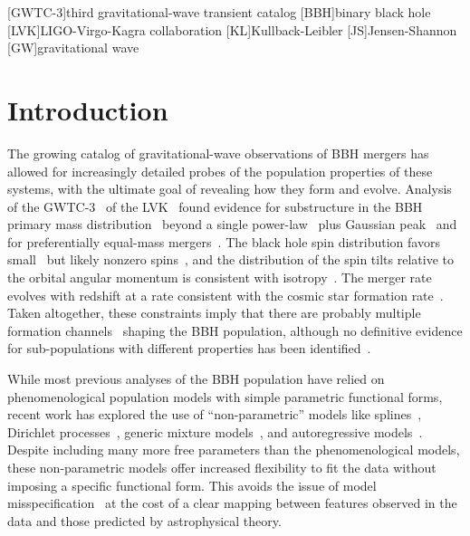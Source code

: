 \documentclass[%
 reprint,
 amsmath,amssymb,
 aps,
 prd,
]{revtex4-2}
\begin{document}
[GWTC-3]{third gravitational-wave transient catalog}
[BBH]{binary black hole}
[LVK]{LIGO-Virgo-Kagra collaboration}
[KL]{Kullback-Leibler}
[JS]{Jensen-Shannon}
[GW]{gravitational wave}


\section{Introduction}
The growing catalog of gravitational-wave observations of \acf{BBH} mergers has allowed for increasingly detailed probes of the population properties of these systems, with the ultimate goal of revealing how they form and evolve. Analysis of the \acf{GWTC-3}~\cite{LIGOScientific:2021djp} of the \acf{LVK}~\cite{TheLIGOScientific:2014jea, TheVirgo:2014hva, Aso:2013eba, Somiya:2011np, KAGRA:2020tym} found evidence for substructure in the \ac{BBH} primary mass distribution~\cite{KAGRA:2021duu, Tiwari:2020otp, Edelman:2021zkw} beyond a single power-law~\cite{Fishbach:2017zga} plus Gaussian peak~\cite{Talbot:2018cva} and for preferentially equal-mass mergers~\cite{Fishbach:2019bbm, Farah:2023swu}. The black hole spin distribution favors small~\cite{Wysocki:2018} but likely nonzero spins~\cite{Biscoveanu:2020are, Callister:2022qwb, Tong:2022iws, Mould:2022xeu, Galaudage:2021rkt, Roulet:2021hcu}, and the distribution of the spin tilts relative to the orbital angular momentum is consistent with isotropy~\cite{Roulet:2021hcu, KAGRA:2021duu, Vitale:2022dpa}. The merger rate evolves with redshift at a rate consistent with the cosmic star formation rate~\cite{Fishbach:2021yvy}. Taken altogether, these constraints imply that there are probably multiple formation channels~\cite{Zevin:2020gbd, Cheng:2023ddt, Wong:2020ise} shaping the \ac{BBH} population, although no definitive evidence for sub-populations with different properties has been identified~\cite{Baibhav:2022qxm, Godfrey:2023oxb, Wang:2022gnx}.

While most previous analyses of the \ac{BBH} population have relied on phenomenological population models with simple parametric functional forms, recent work has explored the use of ``non-parametric'' models like splines~\cite{Edelman:2022ydv, Golomb:2022bon}, Dirichlet processes~\cite{Rinaldi:2021bhm}, generic mixture models~\cite{Tiwari:2020otp,Tiwari:2020vym,Tiwari:2021yvr}, and autoregressive models~\cite{Callister:2023tgi}. Despite including many more free parameters than the phenomenological models, these non-parametric models offer increased flexibility to fit the data without imposing a specific functional form. This avoids the issue of model misspecification~\cite[e.g.,][]{Romero-Shaw:2022ctb} at the cost of a clear mapping between features observed in the data and those predicted by astrophysical theory.
\end{document}
